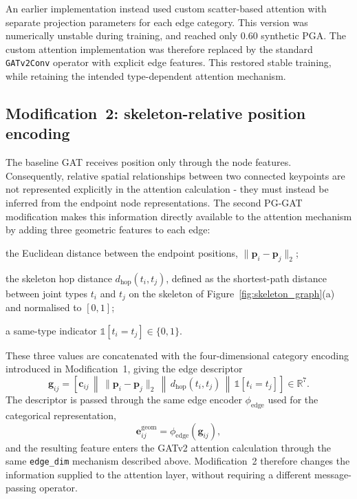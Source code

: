 An earlier implementation instead used custom scatter-based attention
with separate projection parameters for each edge category.
This version was numerically unstable during training,
and reached only $0.60$ synthetic PGA.
The custom attention implementation was therefore replaced
by the standard \texttt{GATv2Conv} operator with explicit edge features.
This restored stable training,
while retaining the intended type-dependent attention mechanism.

\subsection{Modification~2: skeleton-relative position encoding}
\label{sec_meth_pggat_posenc}

The baseline GAT receives position only through the node features.
Consequently, relative spatial relationships between two connected
keypoints are not represented explicitly in the attention calculation -
they must instead be inferred from the endpoint node representations.
The second PG-GAT modification makes this information directly
available to the attention mechanism by adding three geometric features
to each edge:

\begin{compactitem}
    \item the Euclidean distance between the endpoint positions,
        $\|\mathbf{p}_i-\mathbf{p}_j\|_2$;

    \item the skeleton hop distance $d_{\text{hop}}(t_i,t_j)$, defined
        as the shortest-path distance between joint types $t_i$ and
        $t_j$ on the skeleton of Figure~\ref{fig:skeleton_graph}(a) and normalised to $[0,1]$;

    \item a same-type indicator
        $\mathbb{1}[t_i=t_j]\in\{0,1\}$.
\end{compactitem}

These three values are concatenated with the four-dimensional category
encoding introduced in Modification~1,
giving the edge descriptor
\begin{equation}
    \mathbf{g}_{ij}
    =
    \left[
        \mathbf{c}_{ij}
        \,\middle\|\,
        \|\mathbf{p}_i-\mathbf{p}_j\|_2
        \,\middle\|\,
        d_{\text{hop}}(t_i,t_j)
        \,\middle\|\,
        \mathbb{1}[t_i=t_j]
    \right]
    \in \mathbb{R}^{7}.
\end{equation}
The descriptor is passed through the same edge encoder
$\phi_{\text{edge}}$ used for the categorical representation,
\begin{equation}
    \mathbf{e}_{ij}^{\text{geom}}
    =
    \phi_{\text{edge}}(\mathbf{g}_{ij}),
\end{equation}
and the resulting feature enters the GATv2 attention calculation
through the same \texttt{edge\_dim} mechanism described above.
Modification~2 therefore changes the information supplied
to the attention layer,
without requiring a different message-passing operator.

